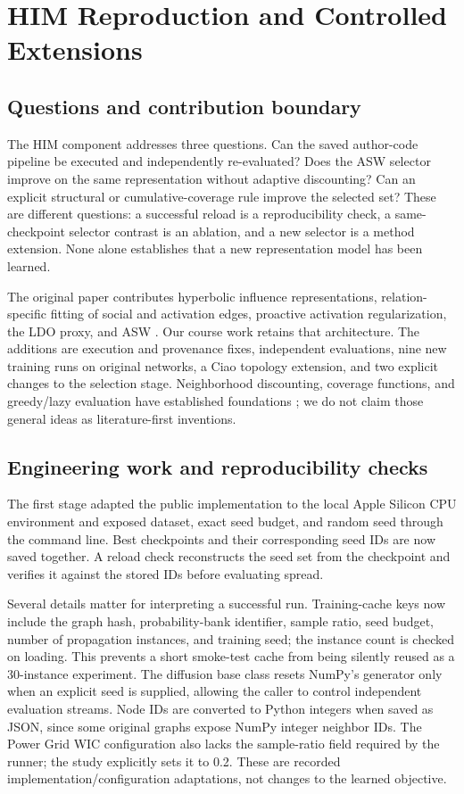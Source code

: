 \section{HIM Reproduction and Controlled Extensions}
\label{sec:him-experiments}
\subsection{Questions and contribution boundary}
The HIM component addresses three questions. Can the saved author-code pipeline be executed and independently re-evaluated? Does the ASW selector improve on the same representation without adaptive discounting? Can an explicit structural or cumulative-coverage rule improve the selected set? These are different questions: a successful reload is a reproducibility check, a same-checkpoint selector contrast is an ablation, and a new selector is a method extension. None alone establishes that a new representation model has been learned.

The original paper contributes hyperbolic influence representations, relation-specific fitting of social and activation edges, proactive activation regularization, the LDO proxy, and ASW \cite{him}. Our course work retains that architecture. The additions are execution and provenance fixes, independent evaluations, nine new training runs on original networks, a Ciao topology extension, and two explicit changes to the selection stage. Neighborhood discounting, coverage functions, and greedy/lazy evaluation have established foundations \cite{kempe,celf}; we do not claim those general ideas as literature-first inventions.

\subsection{Engineering work and reproducibility checks}
The first stage adapted the public implementation to the local Apple Silicon CPU environment and exposed dataset, exact seed budget, and random seed through the command line. Best checkpoints and their corresponding seed IDs are now saved together. A reload check reconstructs the seed set from the checkpoint and verifies it against the stored IDs before evaluating spread.

Several details matter for interpreting a successful run. Training-cache keys now include the graph hash, probability-bank identifier, sample ratio, seed budget, number of propagation instances, and training seed; the instance count is checked on loading. This prevents a short smoke-test cache from being silently reused as a 30-instance experiment. The diffusion base class resets NumPy's generator only when an explicit seed is supplied, allowing the caller to control independent evaluation streams. Node IDs are converted to Python integers when saved as JSON, since some original graphs expose NumPy integer neighbor IDs. The Power Grid WIC configuration also lacks the sample-ratio field required by the runner; the study explicitly sets it to 0.2. These are recorded implementation/configuration adaptations, not changes to the learned objective.

